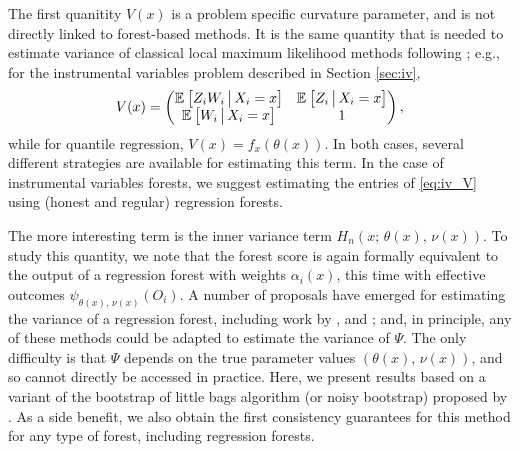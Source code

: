 \documentclass[aos]{imsart}
\theoremstyle{plain}
\theoremstyle{definition}
\theoremstyle{remark}
\begin{document}
\begin{CJK}{UTF8}{gbsn}
The first quanitity $V(x)$ is a problem specific curvature parameter, and is
not directly linked to forest-based methods. It is the same quantity that is needed
to estimate variance of classical local maximum likelihood methods following \citet{newey1994kernel};
e.g., for the instrumental variables problem described in Section \ref{sec:iv},
\begin{equation}
\label{eq:iv_V}
V(x) = \begin{pmatrix}
\EE{Z_iW_i\cond X_i = x} & \EE{Z_i\cond X_i = x} \\
\EE{W_i\cond X_i = x} & 1
\end{pmatrix},
\end{equation}
while for quantile regression, $V(x) = f_x(\theta(x))$.  In both cases,
several different strategies are available for estimating this term. In the
case of instrumental variables forests, we suggest estimating the
entries of \eqref{eq:iv_V} using (honest and regular) regression forests.

The more interesting term is the inner variance term $H_n(x; \, \theta(x), \, \nu(x))$. To
study this quantity, we note that the forest score
is again formally equivalent to the output of a regression forest with weights
$\alpha_i(x)$, this time with effective outcomes $\psi_{\theta(x), \, \nu(x)}(O_i)$.
A number of proposals have emerged for estimating the variance of a regression
forest, including work by \citet{sexton2009standard}, \citet{mentch2016quantifying}
and \citet{wager2014confidence}; and, in principle, any of these methods could be
adapted to estimate the variance of $\Psi$. The only difficulty is that $\Psi$ depends
on the true parameter values $(\theta(x), \, \nu(x))$, and so cannot directly be
accessed in practice.
Here, we present results based on a variant of the bootstrap of little bags algorithm (or noisy bootstrap) proposed
by \citet{sexton2009standard}. As a side benefit, we also obtain the first consistency guarantees for
this method for any type of forest, including regression forests.



\end{CJK}
\end{document}
